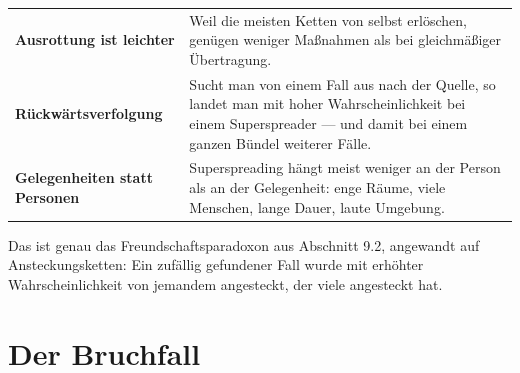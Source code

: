 \begin{merksatz}
\begin{center}
{\small
\renewcommand{\arraystretch}{1.52}
\begin{tabular}{@{}P{3.2cm}P{5.4cm}@{}}
\toprule
\textbf{Ausrottung ist leichter} & Weil die meisten Ketten von selbst erlöschen, genügen weniger Maßnahmen als bei gleichmäßiger Übertragung.\\
\textbf{Rückwärts\-verfolgung} & Sucht man von einem Fall aus  nach der Quelle, so landet man mit hoher Wahrscheinlichkeit bei einem Superspreader --- und damit bei einem ganzen Bündel weiterer Fälle.\\
\textbf{Gelegenheiten statt Personen} & Superspreading hängt meist weniger an der Person als an der Gelegenheit: enge Räume, viele Menschen, lange Dauer, laute Umgebung.\\
\bottomrule
\end{tabular}}
\end{center}

Das ist genau das Freundschaftsparadoxon aus Abschnitt 9.2, angewandt auf Ansteckungsketten: Ein zufällig gefundener Fall wurde mit erhöhter Wahrscheinlichkeit von jemandem angesteckt, der viele angesteckt hat.

\begin{center}
\begin{minipage}{0.88\textwidth}
\end{minipage}
\end{center}
\end{merksatz}

\section{Der Bruchfall}

